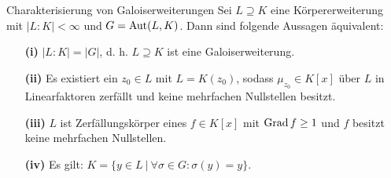 \begin{genericthm}{Charakterisierung von Galoiserweiterungen}\label{skript:15.6}
	Sei $L\supseteq K$ eine Körpererweiterung mit $|L:K|<\infty$ und $G=\operatorname{Aut}(L,K)$. Dann sind folgende Aussagen äquivalent:
	\begin{itemize}
		\item[\textbf{(i)}]
		$|L:K|=|G|$, d. h. $L\supseteq K$ ist eine Galoiserweiterung.
		\item[\textbf{(ii)}]
		Es existiert ein $z_0\in L$ mit $L=K(z_0)$, sodass $\mu_{z_0}\in K[x]$ über $L$ in Linearfaktoren zerfällt und keine mehrfachen Nullstellen besitzt.
		\item[\textbf{(iii)}]
		$L$ ist Zerfällungskörper eines $f\in K[x]$ mit $\operatorname{Grad} f\geq 1$ und $f$ besitzt keine mehrfachen Nullstellen.
		\item[\textbf{(iv)}]
		Es gilt: $K=\{y\in L\ |\ \forall\sigma\in G:\sigma(y)=y\}$.
	\end{itemize}
\end{genericthm}